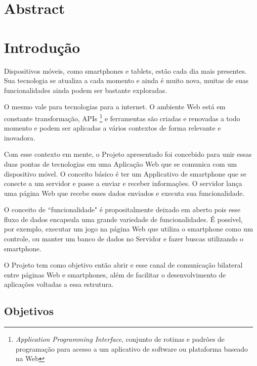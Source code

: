 \documentclass[a4paper,12pt]{article}
\begin{document}
\newpage
\section{Abstract}


\newpage
\section{Introdução}
Dispositivos móveis, como smartphones e tablets, estão cada dia mais presentes. Sua tecnologia se atualiza a cada momento e ainda é muito nova, muitas de suas funcionalidades ainda podem ser bastante exploradas.

O mesmo vale para tecnologias para a internet. O ambiente Web está em constante transformação, APIs \footnote{\emph{Application Programming Interface}, conjunto de rotinas e padrões de programação para acesso a um aplicativo de software ou plataforma baseado na Web} e ferramentas são criadas e renovadas a todo momento e podem ser aplicadas a vários contextos de forma relevante e inovadora.

Com esse contexto em mente, o Projeto apresentado foi concebido para unir essas duas pontas de tecnologias em uma Aplicação Web que se comunica com um dispositivo móvel. O conceito básico é ter um Applicativo de smartphone que se conecte a um servidor e passe a enviar e receber informações. O servidor lança uma página Web que recebe esses dados enviados e executa sua funcionalidade.

O conceito de “funcionalidade" é propositalmente deixado em aberto pois esse fluxo de dados encapsula uma grande variedade de funcionalidades. É possível, por exemplo, executar um jogo na página Web que utiliza o smartphone como um controle, ou manter um banco de dados no Servidor e fazer buscas utilizando o smartphone.

O Projeto tem como objetivo então abrir e esse canal de comunicação bilateral entre páginas Web e smartphones, além de facilitar o desenvolvimento de aplicações voltadas a essa estrutura.




\newpage
\subsection{Objetivos}
\end{document}

